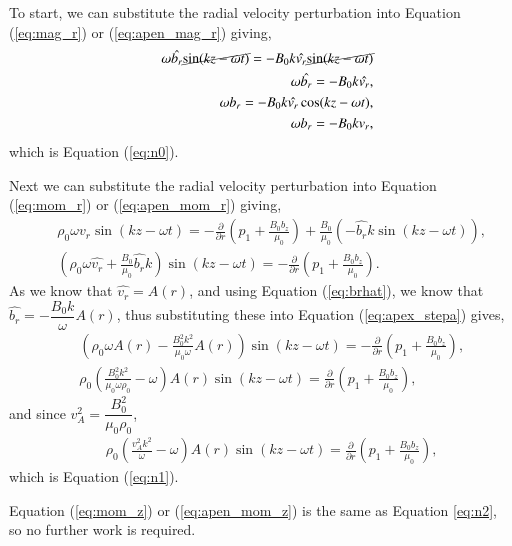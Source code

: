 To start, we can substitute the radial velocity perturbation into Equation (\ref{eq:mag_r}) or (\ref{eq:apen_mag_r}) giving,
\begin{align}
	&&\omega \hat{b_r} \cancel{\sin(kz-\omega t)} = -B_0k\hat{v_r} \cancel{\sin(kz-\omega t)}\\
	&&\omega \hat{b_r}= -B_0k\hat{v_r},\label{eq:brhat}\\
	&&\omega b_r=-B_0k\hat{v_r}\cos(kz-\omega t),\\
	&&\omega b_r=-B_0k{v_r},
\end{align}
which is Equation (\ref{eq:n0}).

Next we can substitute the radial velocity perturbation into Equation (\ref{eq:mom_r}) or (\ref{eq:apen_mom_r}) giving,
\begin{align}
    &&\rho_0 \omega \hat{v_r} \sin(kz-\omega t) =-\frac{\partial}{\partial r}
    \left(p_1+\frac{B_0b_z}{\mu_0}\right)+\frac{B_0}{\mu_0}\left(-\hat{b_r}k\sin(kz-\omega t)\right),\\
    &&\left(\rho_0 \omega \hat{v_r} + \frac{B_0}{\mu_0}\hat{b_r}k \right)\sin(kz-\omega t) =-\frac{\partial}{\partial r}\left(p_1+\frac{B_0b_z}{\mu_0}\right).\label{eq:apex_stepa}
\end{align}
As we know that $\hat{v_r} = A(r)$, and using Equation (\ref{eq:brhat}), we know that $\hat{b_r} = -\dfrac{B_0 k}{\omega}A(r)$, thus substituting these into Equation (\ref{eq:apex_stepa}) gives,
\begin{align}
&&\left(\rho_0 \omega A(r) - \frac{B_0^2 k^2}{\mu_0 \omega}A(r) \right)\sin(kz-\omega t) =-\frac{\partial}{\partial r}\left(p_1+\frac{B_0b_z}{\mu_0}\right),\\
&&\rho_0 \left(\frac{B_0^2 k^2}{\mu_0 \omega \rho_0} - \omega \right)A(r)\sin(kz-\omega t) =\frac{\partial}{\partial r}\left(p_1+\frac{B_0b_z}{\mu_0}\right),
\end{align}
and since $v_A^2 = \dfrac{B_0^2}{\mu_0\rho_0}$,
\begin{align}
&&\rho_0 \left(\frac{v_A^2 k^2}{\omega} - \omega \right)A(r)\sin(kz-\omega t) =\frac{\partial}{\partial r}\left(p_1+\frac{B_0b_z}{\mu_0}\right),
\end{align}
which is Equation (\ref{eq:n1}).

Equation (\ref{eq:mom_z}) or (\ref{eq:apen_mom_z}) is the same as Equation \ref{eq:n2}, so no further work is required.

